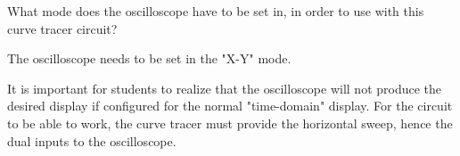 

What mode does the oscilloscope have to be set in, in order to use with this curve tracer circuit?







The oscilloscope needs to be set in the "X-Y" mode.







It is important for students to realize that the oscilloscope will not produce the desired display if configured for the normal "time-domain" display.  For the circuit to be able to work, the curve tracer must provide the horizontal sweep, hence the dual inputs to the oscilloscope.



